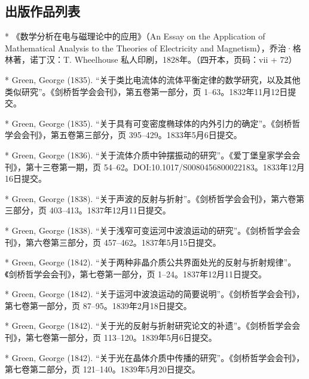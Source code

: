 \subsection{出版作品列表}

* 《数学分析在电与磁理论中的应用》（An Essay on the Application of Mathematical Analysis to the Theories of Electricity and Magnetism），乔治·格林著，诺丁汉：T. Wheelhouse 私人印刷，1828年。（四开本，页码：vii + 72）

* Green, George (1835). “关于类比电流体的流体平衡定律的数学研究，以及其他类似研究”。《剑桥哲学会会刊》，第五卷第一部分，页 1–63。1832年11月12日提交。

* Green, George (1835). “关于具有可变密度椭球体的内外引力的确定”。《剑桥哲学会会刊》，第五卷第三部分，页 395–429。1833年5月6日提交。

* Green, George (1836). “关于流体介质中钟摆振动的研究”。《爱丁堡皇家学会会刊》，第十三卷第一期，页 54–62。DOI:10.1017/S0080456800022183。1833年12月16日提交。

* Green, George (1838). “关于声波的反射与折射”。《剑桥哲学会会刊》，第六卷第三部分，页 403–413。1837年12月11日提交。

* Green, George (1838). “关于浅窄可变运河中波浪运动的研究”。《剑桥哲学会会刊》，第六卷第三部分，页 457–462。1837年5月15日提交。

* Green, George (1842). “关于两种非晶介质公共界面处光的反射与折射规律”。《剑桥哲学会会刊》，第七卷第一部分，页 1–24。1837年12月11日提交。

* Green, George (1842). “关于运河中波浪运动的简要说明”。《剑桥哲学会会刊》，第七卷第一部分，页 87–95。1839年2月18日提交。

* Green, George (1842). “关于光的反射与折射研究论文的补遗”。《剑桥哲学会会刊》，第七卷第一部分，页 113–120。1839年5月6日提交。

* Green, George (1842). “关于光在晶体介质中传播的研究”。《剑桥哲学会会刊》，第七卷第二部分，页 121–140。1839年5月20日提交。
